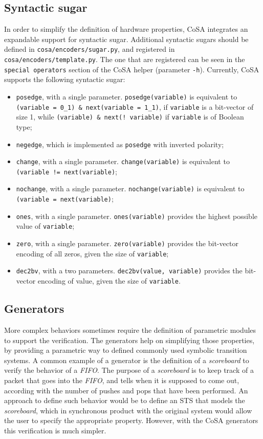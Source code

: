 \documentclass{article}
\theoremstyle{definition}
\begin{document}
\subsection{Syntactic sugar}

In order to simplify the definition of hardware properties, CoSA
integrates an expandable support for syntactic sugar. Additional
syntactic sugars should be defined in \texttt{cosa/encoders/sugar.py},
and registered in \texttt{cosa/encoders/template.py}. The one that are
registered can be seen in the \texttt{special operators} section of
the CoSA helper (parameter \texttt{-h}). Currently, CoSA supports the
following syntactic sugar:

\begin{itemize}
\item \texttt{posedge}, with a single
  parameter. \texttt{posedge(variable)} is equivalent to \texttt{(variable
    = 0\_1) \& next(variable = 1\_1)}, if \texttt{variable} is a
  bit-vector of size 1, while \texttt{(variable) \& next(! variable)} if
  \texttt{variable} is of Boolean type;
\item \texttt{negedge}, which is implemented as \texttt{posedge} with
  inverted polarity;
\item \texttt{change}, with a single
  parameter. \texttt{change(variable)} is equivalent to
  \texttt{(variable != next(variable)};
\item \texttt{nochange}, with a single
  parameter. \texttt{nochange(variable)} is equivalent to
  \texttt{(variable = next(variable)};
\item \texttt{ones}, with a single parameter. \texttt{ones(variable)}
  provides the highest possible value of \texttt{variable};
\item \texttt{zero}, with a single parameter. \texttt{zero(variable)}
  provides the bit-vector encoding of all zeros, given the size of
  \texttt{variable};
\item \texttt{dec2bv}, with a two parameters. \texttt{dec2bv(value,
  variable)} provides the bit-vector encoding of value, given the size
  of \texttt{variable}.
\end{itemize}

\subsection{Generators}

More complex behaviors sometimes require the definition of parametric
modules to support the verification. The generators help on
simplifying those properties, by providing a parametric way to defined
commonly used symbolic transition systems. A common example of a
generator is the definition of a \emph{scoreboard} to verify the
behavior of a \emph{FIFO}. The purpose of a \emph{scoreboard} is to
keep track of a packet that goes into the \emph{FIFO}, and tells when
it is supposed to come out, according with the number of pushes and
pops that have been performed. An approach to define such behavior
would be to define an STS that models the \emph{scoreboard}, which in
synchronous product with the original system would allow the user to
specify the appropriate property. However, with the CoSA generators
this verification is much simpler.
\end{document}
